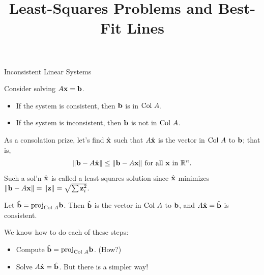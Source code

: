 \documentclass[xcolor=dvipsnames,aspectratio=169,t]{beamer}
\title{Least-Squares Problems and Best-Fit Lines}
\begin{document}
\maketitle

\begin{frame}{Inconsistent Linear Systems}
  
  Consider solving $A\mathbf{x}=\mathbf{b}$.
  \begin{itemize}
    \item If the system is consistent, then $\mathbf{b}$ is in $\mbox{Col } A$.
    \item If the system is \alert{inconsistent}, then $\mathbf{b}$ is \alert{not} in $\mbox{Col } A$.
  \end{itemize}
  \bigskip
  
  \pause
  As a consolation prize, let's find $\hat{\mathbf{x}}$ such that $A\hat{\mathbf{x}}$ is the  vector in $\mbox{Col } A$ to $\mathbf{b}$; that is, 
  \[ \| \mathbf{b}-A\hat{\mathbf{x}} \| \le \| \mathbf{b}-A\mathbf{x} \| \text{ for all $\mathbf{x}$ in $\mathbb{R}^n$.} \]
  Such a sol'n $\hat{\mathbf{x}}$ is called a \alert{least-squares solution}
  since $\hat{\mathbf{x}}$ minimizes $\|\mathbf{b}-A\mathbf{x}\|=\|\mathbf{z}\|=\sqrt{\sum \mathbf{z}_i^2}$.
  \bigskip
  
  \pause
  Let $\hat{\mathbf{b}}=\mbox{proj}_{\text{Col }A} \mathbf{b}$.
  Then $\hat{\mathbf{b}}$ is the  vector in $\mbox{Col } A$ to $\mathbf{b}$,
  and $A\hat{\mathbf{x}}=\hat{\mathbf{b}}$ is \alert{consistent}.
  \bigskip
  
  \pause
  We know how to do each of these steps:
  \begin{itemize}
    \item Compute $\hat{\mathbf{b}}=\mbox{proj}_{\text{Col }A} \mathbf{b}$. (How?)
    \item Solve $A\hat{\mathbf{x}}=\hat{\mathbf{b}}$.
    \pause
    \hspace*{15em} But there is a \alert{simpler} way!
  \end{itemize}
\end{frame}
\end{document}
